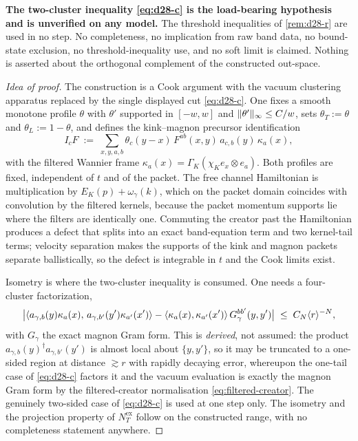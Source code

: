 \begin{scope}
\label{scope:ac-ex}
\textbf{The two-cluster inequality \eqref{eq:d28-c} is the load-bearing
hypothesis and is unverified on any model.} The threshold inequalities of
\cref{rem:d28-r} are used in no step. No completeness, no implication from raw
band data, no bound-state exclusion, no threshold-inequality use, and no soft
limit is claimed. Nothing is asserted about the orthogonal complement of the
constructed out-space.
\end{scope}

\begin{proof}[Idea of proof]
The construction is a Cook argument with the vacuum clustering apparatus
replaced by the single displayed cut \eqref{eq:d28-c}. One fixes a smooth
monotone profile $\theta$ with $\theta'$ supported in $[-w,w]$ and
$\lVert \theta'\rVert_\infty\le C/w$, sets $\theta_T:=\theta$ and
$\theta_L:=1-\theta$, and defines the kink--magnon precursor identification
\begin{equation}
  I_cF\;:=\;\sum_{x,y,a,b}\theta_c(y-x)\,F^{ab}(x,y)\,
  a_{c,b}(y)\,\kappa_a(x),
  \label{eq:precursor-identification}
\end{equation}
with the filtered Wannier frame $\kappa_a(x)=\Gamma_K(\chi_Ke_x\otimes e_a)$.
Both profiles are fixed, independent of $t$ and of the packet. The free channel
Hamiltonian is multiplication by $E_K(p)+\omega_\gamma(k)$, which on the packet
domain coincides with convolution by the filtered kernels, because the packet
momentum supports lie where the filters are identically one. Commuting the
creator past the Hamiltonian produces a defect that splits into an exact
band-equation term and two kernel-tail terms; velocity separation makes the
supports of the kink and magnon packets separate ballistically, so the defect
is integrable in $t$ and the Cook limits exist.

Isometry is where the two-cluster inequality is consumed. One needs a
four-cluster factorization,
\begin{equation}
  \bigl|\langle a_{\gamma,b}(y)\kappa_a(x),\,
  a_{\gamma,b'}(y')\kappa_{a'}(x')\rangle
  -\langle \kappa_a(x),\kappa_{a'}(x')\rangle\,G_\gamma^{bb'}(y,y')\bigr|
  \;\le\;C_N\langle r\rangle^{-N},
  \label{eq:four-cluster}
\end{equation}
with $G_\gamma$ the exact magnon Gram form. This is \emph{derived}, not
assumed: the product $a_{\gamma,b}(y)^\dagger a_{\gamma,b'}(y')$ is almost
local about $\{y,y'\}$, so it may be truncated to a one-sided region at
distance $\gtrsim r$ with rapidly decaying error, whereupon the one-tail case
of \eqref{eq:d28-c} factors it and the vacuum evaluation is exactly the magnon
Gram form by the filtered-creator normalisation
\eqref{eq:filtered-creator}. The genuinely two-sided case of \eqref{eq:d28-c}
is used at one step only. The isometry and the projection property of
$N_T^{\mathrm{ex}}$ follow on the constructed range, with no completeness
statement anywhere.
\end{proof}

